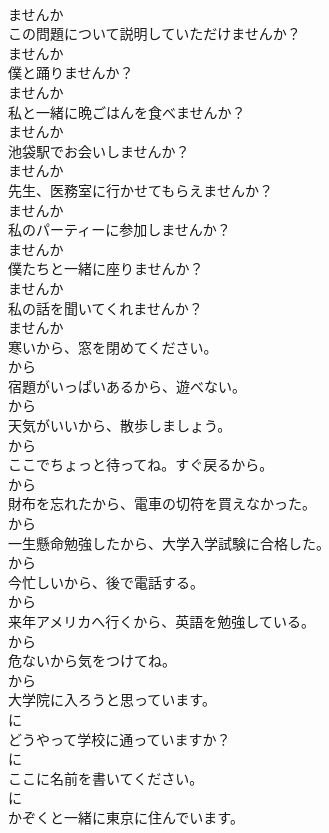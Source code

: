 \documentclass[8pt]{extreport}
\begin{document}
\begin{CJK}{UTF8}{min}
\\	ませんか
\\	この問題について説明していただけませんか？	
\\	ませんか
\\	僕と踊りませんか？	
\\	ませんか
\\	私と一緒に晩ごはんを食べませんか？	
\\	ませんか
\\	池袋駅でお会いしませんか？	
\\	ませんか
\\	先生、医務室に行かせてもらえませんか？	
\\	ませんか
\\	私のパーティーに参加しませんか？	
\\	ませんか
\\	僕たちと一緒に座りませんか？	
\\	ませんか
\\	私の話を聞いてくれませんか？	
\\	ませんか
\\	寒いから、窓を閉めてください。	
\\	から
\\	宿題がいっぱいあるから、遊べない。	
\\	から
\\	天気がいいから、散歩しましょう。	
\\	から
\\	ここでちょっと待ってね。すぐ戻るから。	
\\	から
\\	財布を忘れたから、電車の切符を買えなかった。	
\\	から
\\	一生懸命勉強したから、大学入学試験に合格した。	
\\	から
\\	今忙しいから、後で電話する。	
\\	から
\\	来年アメリカへ行くから、英語を勉強している。	
\\	から
\\	危ないから気をつけてね。	
\\	から
\\	大学院に入ろうと思っています。	
\\	に
\\	どうやって学校に通っていますか？	
\\	に
\\	ここに名前を書いてください。	
\\	に
\\	かぞくと一緒に東京に住んでいます。	

\end{CJK}
\end{document}
